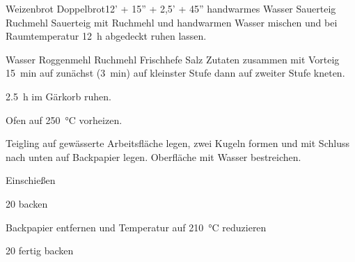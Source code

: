 \begin{MyRecipe}{Weizenbrot}{ Doppelbrot}{12' + 15'' + 2,5' + 45''}
	\ingredient[\Calc{50}{\x}]{\si{\gram}} {handwarmes Wasser}
	\ingredient[\Calc{5}{\x}]{\si{\gram}} {Sauerteig}
	\ingredient[\Calc{50}{\x}]{\si{\gram}} {Ruchmehl}
	Sauerteig mit Ruchmehl und handwarmen Wasser mischen und bei Raumtemperatur \SI{12}{\hour} abgedeckt ruhen lassen.\par\bigskip

	\ingredient[\Calc{0.4}{\x}]{\si{\liter}} {Wasser}
	\ingredient[\Calc{125}{\x}]{\si{\gram}} {Roggenmehl}
	\ingredient[\Calc{325}{\x}]{\si{\gram}} {Ruchmehl}
	\ingredient[\Calc{5}{\x}]{\si{\gram}} {Frischhefe}
	\ingredient[\Calc{10}{\x}]{\si{\gram}} {Salz}
	Zutaten zusammen mit Vorteig \SI{15}{\minute} auf zunächst (\SI{3}{\minute}) auf kleinster Stufe dann auf zweiter Stufe kneten.
	
	\SI{2,5}{\hour} im Gärkorb ruhen.\par\bigskip

	Ofen auf \SI{250}{\degreeCelsius} vorheizen.
	
	Teigling auf gewässerte Arbeitsfläche legen, zwei Kugeln formen und mit Schluss nach unten auf Backpapier legen. Oberfläche mit Wasser bestreichen.\par\bigskip
	
	Einschießen
	
	\SI{20}{\min} backen
	
	Backpapier entfernen und Temperatur auf \SI{210}{\degreeCelsius} reduzieren
	
	\SI{20}{\min} fertig backen
	
	
	
	
	
	
\end{MyRecipe}